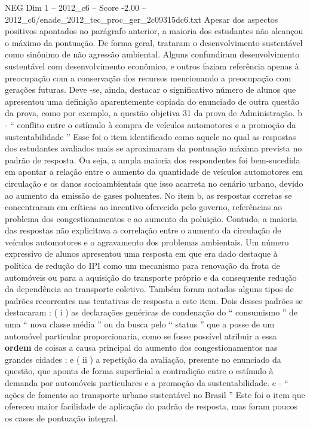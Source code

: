 \begin{textsample}{NEG Dim 1 – 2012\_c6 – Score -2.00 – 2012\_c6/enade\_2012\_tec\_proc\_ger\_2c09315dc6.txt}
Apesar dos aspectos positivos apontados no parágrafo anterior, a maioria dos estudantes não alcançou o máximo da pontuação.
De forma geral, trataram o desenvolvimento sustentável como sinônimo de não agressão ambiental.
Alguns confundiram desenvolvimento sustentável com desenvolvimento econômico, e outros faziam referência apenas à preocupação com a conservação dos recursos mencionando a preocupação com gerações futuras.
Deve -se, ainda, destacar o significativo número de alunos que apresentou uma definição aparentemente copiada do enunciado de outra questão da prova, como por exemplo, a questão objetiva 31 da prova de Administração. b - “ conflito entre o estímulo à compra de veículos automotores e a promoção da sustentabilidade ” Esse foi o item identificado como aquele no qual as respostas dos estudantes avaliados mais se aproximaram da pontuação máxima prevista no padrão de resposta.
Ou seja, a ampla maioria dos respondentes foi bem-sucedida em apontar a relação entre o aumento da quantidade de veículos automotores em circulação e os danos socioambientais que isso acarreta no cenário urbano, devido ao aumento da emissão de gases poluentes.
No item b, as respostas corretas se concentraram em críticas ao incentivo oferecido pelo governo, referências ao problema dos congestionamentos e ao aumento da poluição.
Contudo, a maioria das respostas não explicitava a correlação entre o aumento da circulação de veículos automotores e o agravamento dos problemas ambientais.
Um número expressivo de alunos apresentou uma resposta em que era dado destaque à política de redução do IPI como um mecanismo para renovação da frota de automóveis ou para a aquisição do transporte próprio e da consequente redução da dependência ao transporte coletivo.
Também foram notados alguns tipos de padrões recorrentes nas tentativas de resposta a este item.
Dois desses padrões se destacaram : ( i ) as declarações genéricas de condenação do “ consumismo ” de uma “ nova classe média ” ou da busca pelo “ status ” que a posse de um automóvel particular proporcionaria, como se fosse possível atribuir a essa \textbf{ordem} de coisas a causa principal do aumento dos congestionamentos nas grandes cidades ; e ( ii ) a repetição da avaliação, presente no enunciado da questão, que aponta de forma superficial a contradição entre o estímulo à demanda por automóveis particulares e a promoção da sustentabilidade. c - “ ações de fomento ao transporte urbano sustentável no Brasil ” Este foi o item que ofereceu maior facilidade de aplicação do padrão de resposta, mas foram poucos os casos de pontuação integral.

\end{textsample}
